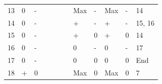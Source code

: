 \documentclass{article}
\begin{document}
\begin{table}[]
\begin{tabular}{llllllllllll}
		13 & 0      & -               &        &                 &          &                   & Max    & -               & Max     & -                & 14       \\
		14 & 0      & -               &        &                 &          &                   & +      & -               & +       & -                & 15, 16   \\
		15 & 0      & -               &        &                 &          &                   & +      & 0               & +       & 0                & 14       \\
		16 & 0      & -               &        &                 &          &                   & 0      & -               & 0       & -                & 17       \\
		17 & 0      & -               &        &                 &          &                   & 0      & 0               & 0       & 0                & End      \\
		18 & +      & 0               &        &                 &          &                   & Max    & 0               & Max     & 0                & 7       
	\end{tabular}
\end{table}
\end{document}
